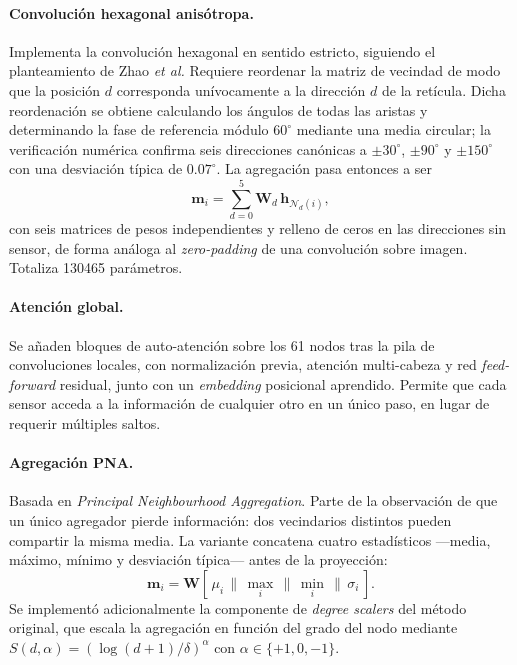 \paragraph{Convolución hexagonal anisótropa.} Implementa la convolución hexagonal en sentido
estricto, siguiendo el planteamiento de Zhao \emph{et al.} Requiere reordenar la matriz de vecindad
de modo que la posición $d$ corresponda unívocamente a la dirección $d$ de la retícula. Dicha
reordenación se obtiene calculando los ángulos de todas las aristas y determinando la fase de
referencia módulo $60^\circ$ mediante una media circular; la verificación numérica confirma seis
direcciones canónicas a $\pm 30^\circ$, $\pm 90^\circ$ y $\pm 150^\circ$ con una desviación típica
de $0.07^\circ$. La agregación pasa entonces a ser
\begin{equation}
    \mathbf{m}_i = \sum_{d=0}^{5} \mathbf{W}_d\, \mathbf{h}_{\mathcal{N}_d(i)},
\end{equation}
con seis matrices de pesos independientes y relleno de ceros en las direcciones sin sensor, de forma
análoga al \emph{zero-padding} de una convolución sobre imagen. Totaliza \num{130465} parámetros.

\paragraph{Atención global.} Se añaden bloques de auto-atención sobre los 61 nodos tras la pila de
convoluciones locales, con normalización previa, atención multi-cabeza y red \emph{feed-forward}
residual, junto con un \emph{embedding} posicional aprendido. Permite que cada sensor acceda a la
información de cualquier otro en un único paso, en lugar de requerir múltiples saltos.

\paragraph{Agregación PNA.} Basada en \emph{Principal Neighbourhood Aggregation}. Parte de la
observación de que un único agregador pierde información: dos vecindarios distintos pueden compartir
la misma media. La variante concatena cuatro estadísticos ---media, máximo, mínimo y desviación
típica--- antes de la proyección:
\begin{equation}
    \mathbf{m}_i = \mathbf{W} \left[\,\mu_i \,\|\, \max_i \,\|\, \min_i \,\|\, \sigma_i \,\right].
\end{equation}
Se implementó adicionalmente la componente de \emph{degree scalers} del método original, que escala
la agregación en función del grado del nodo mediante $S(d,\alpha) = (\log(d+1)/\delta)^{\alpha}$ con
$\alpha \in \{+1, 0, -1\}$.

